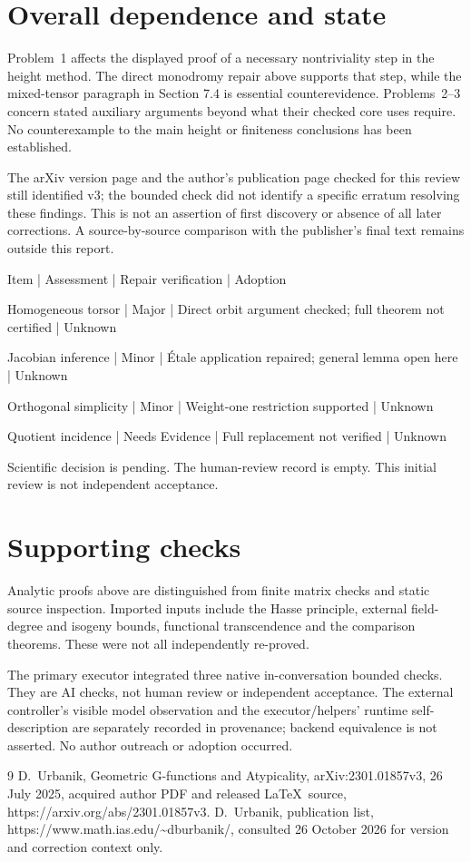 \documentclass[10pt]{article}
\begin{document}
\section*{Overall dependence and state}
Problem 1 affects the displayed proof of a necessary nontriviality step in the height method. The direct monodromy repair above supports that step, while the mixed-tensor paragraph in Section 7.4 is essential counterevidence. Problems 2–3 concern stated auxiliary arguments beyond what their checked core uses require. No counterexample to the main height or finiteness conclusions has been established.\par
The arXiv version page and the author’s publication page checked for this review still identified v3; the bounded check did not identify a specific erratum resolving these findings. This is not an assertion of first discovery or absence of all later corrections. A source-by-source comparison with the publisher’s final text remains outside this report.\par
Item | Assessment | Repair verification | Adoption\par
Homogeneous torsor | Major | Direct orbit argument checked; full theorem not certified | Unknown\par
Jacobian inference | Minor | Étale application repaired; general lemma open here | Unknown\par
Orthogonal simplicity | Minor | Weight-one restriction supported | Unknown\par
Quotient incidence | Needs Evidence | Full replacement not verified | Unknown\par
Scientific decision is pending. The human-review record is empty. This initial review is not independent acceptance.\par
\section*{Supporting checks}
Analytic proofs above are distinguished from finite matrix checks and static source inspection. Imported inputs include the Hasse principle, external field-degree and isogeny bounds, functional transcendence and the comparison theorems. These were not all independently re-proved.\par
The primary executor integrated three native in-conversation bounded checks. They are AI checks, not human review or independent acceptance. The external controller’s visible model observation and the executor/helpers’ runtime self-description are separately recorded in provenance; backend equivalence is not asserted. No author outreach or adoption occurred.\par
9 D. Urbanik, Geometric G-functions and Atypicality, arXiv:2301.01857v3, 26 July 2025, acquired author PDF and released LaTeX source, https://arxiv.org/abs/2301.01857v3. D. Urbanik, publication list, https://www.math.ias.edu/\textasciitilde{}dburbanik/, consulted 26 October 2026 for version and correction context only.\par
\end{document}
